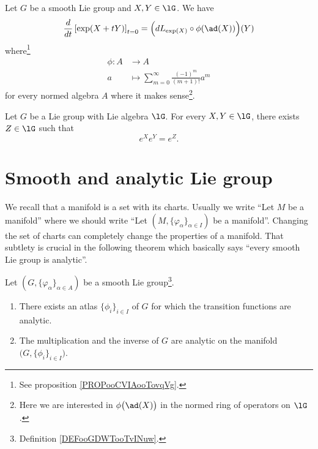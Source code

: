 \begin{theorem}
\begin{lemma}	\label{LEMooTXNVooYmZDOl}
	Let \( G\) be a smooth Lie group and \( X,Y\in\lG\). We have
	\begin{equation}
		\frac{d}{dt} \left[ \exp(X+tY)  \right]_{t=0}=\Big( dL_{\exp(X)}\circ\phi(\ad(X)) \Big)(Y)
	\end{equation}
	where\footnote{See proposition \ref{PROPooCVIAooTovqVg}.}
	\begin{equation}
		\begin{aligned}
			\phi\colon A & \to A                                                   \\
			a            & \mapsto \sum_{m=0}^{\infty}\frac{ (-1)^m }{ (m+1)! }a^m
		\end{aligned}
	\end{equation}
	for every normed algebra \( A\) where it makes sense\footnote{Here we are interested in \( \phi\big(\ad(X)\big)\) in the normed ring of operators on \( \lG\).}.
\end{lemma}



\begin{theorem}     \label{THOooYJPEooSpKHnC}
	Let \( G\) be a Lie group with Lie algebra \( \lG\). For every \( X,Y\in \lG\), there exists \( Z\in \lG\) such that
	\begin{equation}
		e^{X} e^{Y}= e^{Z}.
	\end{equation}
\end{theorem}


\section{Smooth and analytic Lie group}

We recall that a manifold is a set with its charts. Usually we write ``Let \( M\) be a manifold'' where we should write ``Let \( (M,\{ \varphi_{\alpha} \}_{\alpha\in I})\) be a manifold''. Changing the set of charts can completely change the properties of a manifold. That subtlety is crucial in the following theorem which basically says ``every smooth Lie group is analytic''.
\begin{theorem}       \label{THOooSQVCooCyEPOS}
	Let \( (G,\{ \varphi_{\alpha} \}_{\alpha\in A})\) be a smooth Lie group\footnote{Definition \ref{DEFooGDWTooTvINuw}.}.
	\begin{enumerate}
		\item
		      There exists an atlas \( \{ \phi_i \}_{i\in I}\) of \( G\) for which the transition functions are analytic.
		\item
		      The multiplication and the inverse of \( G\) are analytic on the manifold \( \big( G,\{ \phi_i \}_{i\in I} \big)\).
	\end{enumerate}
\end{theorem}


\end{theorem}
